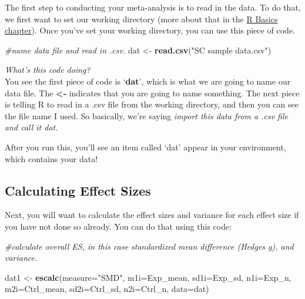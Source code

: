 \documentclass[
]{book}
\newenvironment{Shaded}{\begin{snugshade}}{\end{snugshade}}
\newcommand{\AttributeTok}[1]{\textcolor[rgb]{0.13,0.29,0.53}{#1}}
\newcommand{\CommentTok}[1]{\textcolor[rgb]{0.56,0.35,0.01}{\textit{#1}}}
\newcommand{\FunctionTok}[1]{\textcolor[rgb]{0.13,0.29,0.53}{\textbf{#1}}}
\newcommand{\NormalTok}[1]{#1}
\newcommand{\OtherTok}[1]{\textcolor[rgb]{0.56,0.35,0.01}{#1}}
\newcommand{\StringTok}[1]{\textcolor[rgb]{0.31,0.60,0.02}{#1}}
\begin{document}
The first step to conducting your meta-analysis is to read in the data. To do that, we first want to set our working directory (more about that in the \protect\hyperlink{crossrbasics}{R Basics chapter}). Once you've set your working directory, you can use this piece of code.

\begin{Shaded}
\begin{Highlighting}[]
\CommentTok{\#name data file and read in .csv. }
\NormalTok{dat }\OtherTok{\textless{}{-}} \FunctionTok{read.csv}\NormalTok{(}\StringTok{"SC sample data.csv"}\NormalTok{)}
\end{Highlighting}
\end{Shaded}

\emph{What's this code doing?\\
}You see the first piece of code is `\textbf{dat}', which is what we are going to name our data file. The \textbf{\textless-} indicates that you are going to name something. The next piece is telling R to read in a .csv file from the working directory, and then you can see the file name I used. So basically, we're saying \emph{import this data from a .csv file and call it dat.}

After you run this, you'll see an item called `dat' appear in your environment, which contains your data!

\hypertarget{calculating-effect-sizes}{%
\subsection{Calculating Effect Sizes}\label{calculating-effect-sizes}}

Next, you will want to calculate the effect sizes and variance for each effect size if you have not done so already. You can do that using this code:

\begin{Shaded}
\begin{Highlighting}[]
\CommentTok{\#calculate overall ES, in this case standardized mean difference (Hedges g), and variance.}

\NormalTok{dat1 }\OtherTok{\textless{}{-}} \FunctionTok{escalc}\NormalTok{(}\AttributeTok{measure=}\StringTok{"SMD"}\NormalTok{, }\AttributeTok{m1i=}\NormalTok{Exp\_mean, }\AttributeTok{sd1i=}\NormalTok{Exp\_sd, }\AttributeTok{n1i=}\NormalTok{Exp\_n, }\AttributeTok{m2i=}\NormalTok{Ctrl\_mean, }\AttributeTok{sd2i=}\NormalTok{Ctrl\_sd, }\AttributeTok{n2i=}\NormalTok{Ctrl\_n, }\AttributeTok{data=}\NormalTok{dat)}
\end{Highlighting}
\end{Shaded}
\end{document}
